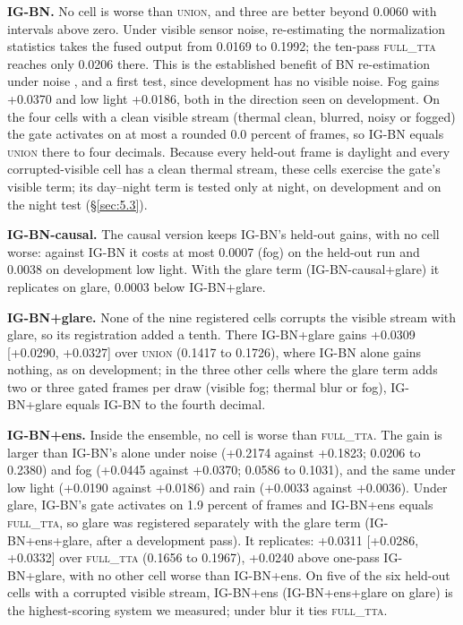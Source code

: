 \documentclass[10pt]{article}
\begin{document}
\textbf{IG-BN.} No cell is worse than \textsc{union}, and three are better beyond 0.0060 with intervals above zero. Under visible sensor noise, re-estimating the normalization statistics takes the fused output from 0.0169 to 0.1992; the ten-pass \textsc{full\_tta} reaches only 0.0206 there. This is the established benefit of BN re-estimation under noise \citep{schneider2020improving}, and a first test, since development has no visible noise. Fog gains +0.0370 and low light +0.0186, both in the direction seen on development. On the four cells with a clean visible stream (thermal clean, blurred, noisy or fogged) the gate activates on at most a rounded 0.0 percent of frames, so IG-BN equals \textsc{union} there to four decimals. Because every held-out frame is daylight and every corrupted-visible cell has a clean thermal stream, these cells exercise the gate's visible term; its day--night term is tested only at night, on development and on the night test (\S\ref{sec:5.3}).

\textbf{IG-BN-causal.} The causal version keeps IG-BN's held-out gains, with no cell worse: against IG-BN it costs at most 0.0007 (fog) on the held-out run and 0.0038 on development low light. With the glare term (IG-BN-causal+glare) it replicates on glare, 0.0003 below IG-BN+glare.

\textbf{IG-BN+glare.} None of the nine registered cells corrupts the visible stream with glare, so its registration added a tenth. There IG-BN+glare gains +0.0309 [+0.0290, +0.0327] over \textsc{union} (0.1417 to 0.1726), where IG-BN alone gains nothing, as on development; in the three other cells where the glare term adds two or three gated frames per draw (visible fog; thermal blur or fog), IG-BN+glare equals IG-BN to the fourth decimal.

\textbf{IG-BN+ens.} Inside the ensemble, no cell is worse than \textsc{full\_tta}. The gain is larger than IG-BN's alone under noise (+0.2174 against +0.1823; 0.0206 to 0.2380) and fog (+0.0445 against +0.0370; 0.0586 to 0.1031), and the same under low light (+0.0190 against +0.0186) and rain (+0.0033 against +0.0036). Under glare, IG-BN's gate activates on 1.9 percent of frames and IG-BN+ens equals \textsc{full\_tta}, so glare was registered separately with the glare term (IG-BN+ens+glare, after a development pass). It replicates: +0.0311 [+0.0286, +0.0332] over \textsc{full\_tta} (0.1656 to 0.1967), +0.0240 above one-pass IG-BN+glare, with no other cell worse than IG-BN+ens. On five of the six held-out cells with a corrupted visible stream, IG-BN+ens (IG-BN+ens+glare on glare) is the highest-scoring system we measured; under blur it ties \textsc{full\_tta}.
\end{document}
